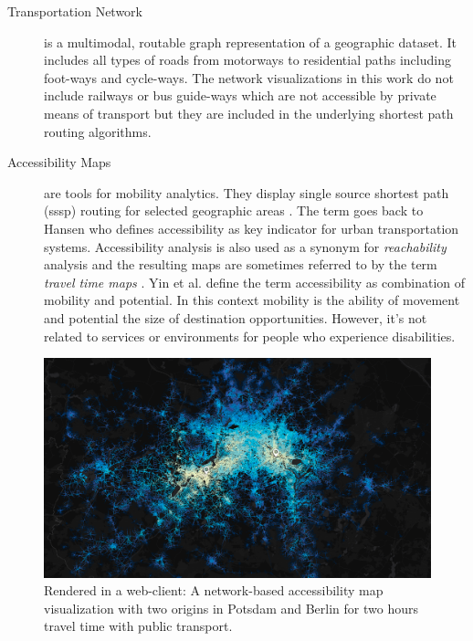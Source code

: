     \begin{description}
      \item[Transportation Network] is a multimodal, routable graph
        representation of a geographic dataset.
        It includes all types of roads from motorways to residential paths
        including foot-ways and cycle-ways. The network visualizations in this
        work do not include railways or bus guide-ways which are not accessible
        by private means of transport but they are included in the underlying
        shortest path routing algorithms.
      \item[Accessibility Maps] are tools for mobility analytics. They display
        single source shortest path (\acrshort{sssp}) routing for selected
        geographic areas \cite{Meyer2001,krumke2009graphentheoretische}. The
        term goes back to Hansen \cite{hansen1959accessibility} who defines
        accessibility as key indicator for urban transportation systems.
        Accessibility analysis is also used as a synonym
        for \textit{reachability} analysis \cite{Innerebner2013} and the
        resulting maps are sometimes referred to by the term \textit{travel time
        maps} \cite{van2010travel}. Yin et al. \cite{Yin2015} define the
        term accessibility as combination of mobility and potential. In this
        context mobility is the ability of movement and potential the size
        of destination opportunities. However, it's not related to services or
        environments for people who experience disabilities.
    \end{description}

    \begin{figure}[ht]
      \centering
      \includegraphics[width=\linewidth]
        {./img/screenshot-teaser-7200s-publictransport.png}
      \caption{Rendered in a web-client: A network-based accessibility map
        visualization with two origins in Potsdam and Berlin for two hours
        travel time with public transport.}
      \label{fig:intro:teasr}
    \end{figure}


